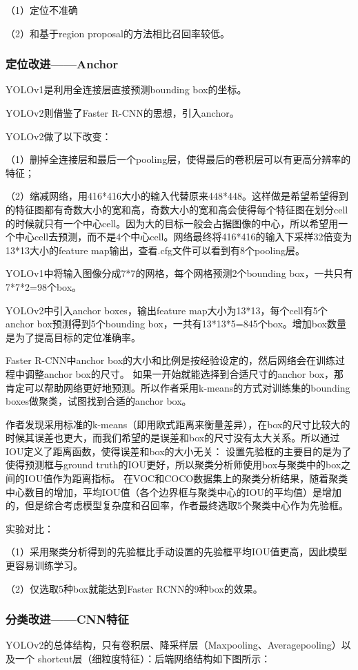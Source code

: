 \documentclass[a4paper, notitlepage]{article}
\begin{document}
（1）定位不准确

（2）和基于region proposal的方法相比召回率较低。

\subsubsection{定位改进——Anchor}
YOLOv1是利用全连接层直接预测bounding box的坐标。

YOLOv2则借鉴了Faster R-CNN的思想，引入anchor。

YOLOv2做了以下改变：

（1）删掉全连接层和最后一个pooling层，使得最后的卷积层可以有更高分辨率的特征；

（2）缩减网络，用416*416大小的输入代替原来448*448。这样做是希望希望得到的特征图都有奇数大小的宽和高，奇数大小的宽和高会使得每个特征图在划分cell的时候就只有一个中心cell。因为大的目标一般会占据图像的中心，所以希望用一个中心cell去预测，而不是4个中心cell。网络最终将416*416的输入下采样32倍变为13*13大小的feature map输出，查看.cfg文件可以看到有8个pooling层。

YOLOv1中将输入图像分成7*7的网格，每个网格预测2个bounding box，一共只有7*7*2=98个box。

YOLOv2中引入anchor boxes，输出feature map大小为13*13，每个cell有5个anchor box预测得到5个bounding box，一共有13*13*5=845个box。增加box数量是为了提高目标的定位准确率。

Faster R-CNN中anchor box的大小和比例是按经验设定的，然后网络会在训练过程中调整anchor box的尺寸。
如果一开始就能选择到合适尺寸的anchor box，那肯定可以帮助网络更好地预测。所以作者采用k-means的方式对训练集的bounding boxes做聚类，试图找到合适的anchor box。

作者发现采用标准的k-means（即用欧式距离来衡量差异），在box的尺寸比较大的时候其误差也更大，而我们希望的是误差和box的尺寸没有太大关系。所以通过IOU定义了距离函数，使得误差和box的大小无关：
设置先验框的主要目的是为了使得预测框与ground truth的IOU更好，所以聚类分析师使用box与聚类中的box之间的IOU值作为距离指标。
在VOC和COCO数据集上的聚类分析结果，随着聚类中心数目的增加，平均IOU值（各个边界框与聚类中心的IOU的平均值）是增加的，但是综合考虑模型复杂度和召回率，作者最终选取5个聚类中心作为先验框。

实验对比：

（1）采用聚类分析得到的先验框比手动设置的先验框平均IOU值更高，因此模型更容易训练学习。

（2）仅选取5种box就能达到Faster RCNN的9种box的效果。


\subsubsection{分类改进——CNN特征}
YOLOv2的总体结构，只有卷积层、降采样层（Maxpooling、Averagepooling）以及一个
shortcut层（细粒度特征）：后端网络结构如下图所示：
\end{document}
